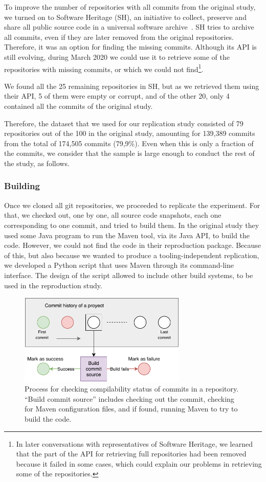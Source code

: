To improve the number of repositories with all commits from the original study,  we turned on to Software Heritage (SH), an initiative to collect, preserve and share all public source code in a universal software archive~\cite{di2017software,di2018software}. SH tries to archive all commits, even if they are later removed from the original repositories. Therefore, it was an option for finding the missing commits. Although its API is still evolving, during March 2020 we could use it to retrieve some of the repositories with missing commits, or which we could not find\footnote{In later conversations with representatives of Software Heritage, we learned that the part of the API for retrieving full repositories had been removed because it failed in some cases, which could explain our problems in retrieving some of the repositories.}.

We found all the 25 remaining repositories in SH, but as we retrieved them using their API, 5 of them were empty or corrupt, and of the other 20, only 4 contained all the commits of the original study.

Therefore, the dataset that we used for our replication study consisted of 79 repositories out of the 100 in the original study, amounting for 139,389 commits from the total of 174,505 commits (79,9\%). Even when this is only a fraction of the commits, we consider that the sample is large enough to conduct the rest of the study, as follows.

\subsubsection{Building}

Once we cloned all git repositories, we proceeded to replicate the experiment. For that, we checked out, one by one, all source code snapshots, each one corresponding to one commit, and tried to build them. In the original study they used some Java program to run the Maven tool, via its Java API, to build the code. However, we could not find the code in their reproduction package. Because of this, but also because we wanted to produce a tooling-independent replication, we developed a Python script that uses Maven through its command-line interface. The design of the script allowed to include other build systems, to be used in the reproduction study.

\begin{figure}[t]
\centering    
\includegraphics[width=8cm]{pages/01-Buildability/images/AnalysisProcess.pdf}
\caption{Process for checking compilability status of commits in a repository. ``Build commit source'' includes checking out the commit, checking for Maven configuration files, and if found, running Maven to try to build the code.}
\label{fig:commitHist}
\end{figure}

